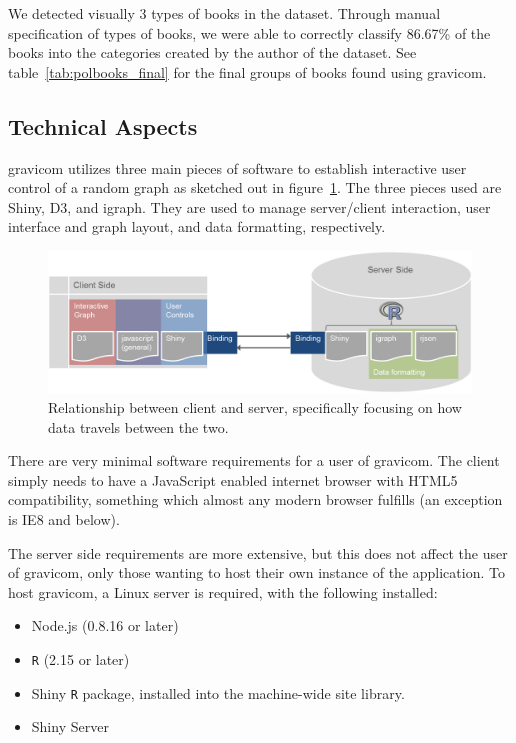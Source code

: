 \documentclass{article}\usepackage[]{graphicx}\usepackage[]{color}
\begin{document}
We detected visually 3 types of books in the dataset. Through manual specification of types of books, we were able to correctly classify 86.67\% of the books into the categories created by the author of the dataset. See table~\ref{tab:polbooks_final} for the final groups of books found using gravicom.


\subsection{Technical Aspects}

gravicom utilizes three main pieces of software to establish interactive user control of a random graph as sketched out in figure~\ref{fig:clientserver}. The three pieces used are Shiny, D3, and igraph. They are used to manage server/client interaction, user interface and graph layout, and data formatting, respectively.

\begin{figure}[H]
\centering
\includegraphics[width=\textwidth]{images/clientserverflow.png}
\caption{\label{fig:clientserver} Relationship between client and server, specifically focusing on how data travels between the two.}
\end{figure}

There are very minimal software requirements for a user of gravicom. The client simply needs to have a JavaScript enabled internet browser with HTML5 compatibility, something which almost any modern browser fulfills (an exception is IE8 and below). 

The server side requirements are more extensive, but this does not affect the user of gravicom, only those wanting to host their own instance of the application. To host gravicom, a Linux server is required, with the following installed:

\begin{itemize}
\item Node.js (0.8.16 or later)
\item {\tt R} (2.15 or later)
\item Shiny {\tt R} package, installed into the machine-wide site library. 
\item Shiny Server
\end{itemize}
\end{document}
